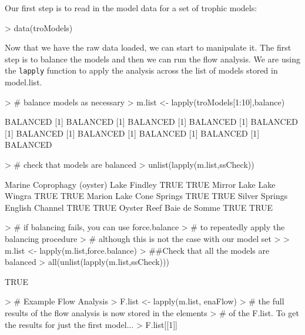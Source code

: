 \documentclass[article]{jss}
\begin{document}
Our first step is to read in the model data for a set of trophic
models:

\begin{Schunk}
\begin{Sinput}
> data(troModels)
\end{Sinput}
\end{Schunk}


Now that we have the raw data loaded, we can start to manipulate
it.  The first step is to balance the models and then we can run the
flow analysis.  We are using the \texttt{lapply} function to apply the
analysis across the list of models stored in model.list.


\begin{Schunk}
\begin{Sinput}
> # balance models as necessary
> m.list <- lapply(troModels[1:10],balance)
\end{Sinput}
\begin{Soutput}
[1] BALANCED
[1] BALANCED
[1] BALANCED
[1] BALANCED
[1] BALANCED
[1] BALANCED
[1] BALANCED
[1] BALANCED
[1] BALANCED
[1] BALANCED
\end{Soutput}
\begin{Sinput}
> # check that models are balanced
> unlist(lapply(m.list,ssCheck))
\end{Sinput}
\begin{Soutput}
Marine Coprophagy (oyster)              Lake Findley  
                      TRUE                       TRUE 
               Mirror Lake                Lake Wingra 
                      TRUE                       TRUE 
               Marion Lake               Cone Springs 
                      TRUE                       TRUE 
            Silver Springs            English Channel 
                      TRUE                       TRUE 
              Oyster Reef               Baie de Somme 
                      TRUE                       TRUE 
\end{Soutput}
\begin{Sinput}
> # if balancing fails, you can use force.balance
> # to repeatedly apply the balancing procedure
> # although this is not the case with our model set
> 
> m.list <- lapply(m.list,force.balance)
> ##Check that all the models are balanced
> all(unlist(lapply(m.list,ssCheck)))
\end{Sinput}
\begin{Soutput}
[1] TRUE
\end{Soutput}
\begin{Sinput}
> # Example Flow Analysis
> F.list <- lapply(m.list, enaFlow)
> # the full results of the flow analysis is now stored in the elements
> # of the F.list.  To get the results for just the first model...
> F.list[[1]]
\end{Sinput}
\end{Schunk}
\end{document}
